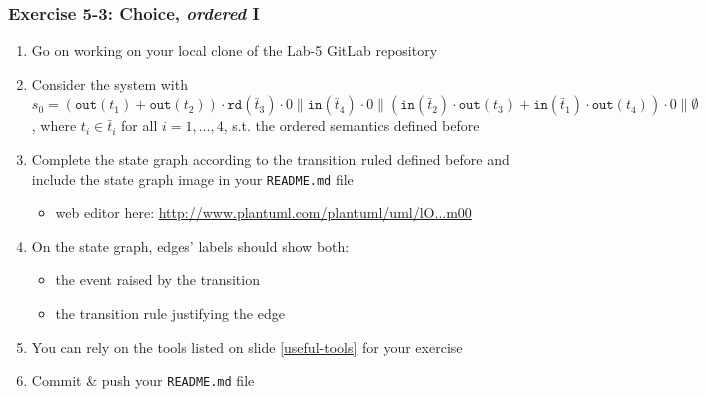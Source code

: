 \documentclass[presentation]{beamer}\mode<presentation>{\usetheme{AMSCesenaPurpleAndGold}}
\begin{document}
\begin{frame}
\frametitle{Exercise 5-3: Choice, \emph{ordered} I}
    \begin{enumerate}
        \item Go on working on your local clone of the Lab-5 GitLab repository
        
        \vfill
        
        \item Consider the system with \alert{$s_0 = (\mathtt{out}(t_1) + \mathtt{out}(t_2)) \cdot \mathtt{rd}(\bar{t}_3) \cdot 0 \parallel \mathtt{in}(\bar{t}_4) \cdot 0 \parallel (\mathtt{in}(\bar{t}_2) \cdot \mathtt{out}(t_3) + \mathtt{in}(\bar{t}_1) \cdot \mathtt{out}(t_4)) \cdot 0  \parallel \emptyset$}, where $t_i \in \bar{t}_i$ for all $i = 1,\ldots,4$, s.t. the \alert{ordered} \linda{} semantics defined before
        
        \vfill
    
        \item Complete the state graph according to the transition ruled defined before and include the state graph image in your \alert{\texttt{README.md}} file
        \begin{itemize}
            \item web editor here: \href{
                http://www.plantuml.com/plantuml/uml/lO_1JW8n48RlVOeviXB8mf4GGbmnUj43yOGS6ZfYGxVTj5CLZGSg9ho8R-DJx9EuiDeWuQgtQV_ld_-VeIDkoUUAkONK1RSyXpEyurxHkT4qbiy8tNHF71Cdt4cqL0YIk98pTznznNE4p7WhqR9xAH0mBsW90jtCoeAaqMpFwRQh0LuOm2cVBURMU2qoeupjzqTQI3qV3C0e-O37Y1kDJqKreQYe9Ifb7jahOvEJARHQ0t0fs-slXXuqZAS6bM6LG1E-vv0aRIiQzBakmrlIJg7SV83KzSVwy2CaxTfNiyqehA8GFUNcdRcqRj7fGSo-rPFiuleo6rMFQIIwaGW7nCy17VXzRG_-flUsP0pj_bzeO4FKmkVg2m00
            }{http://www.plantuml.com/plantuml/uml/lO...m00}
        \end{itemize}
        
        \vfill
        
        \item On the state graph, edges' labels should show both:
        \begin{itemize}
            \item the event raised by the transition
            \item the transition rule justifying the edge
        \end{itemize}
        
        \vfill
        
        \item You can rely on the tools listed on slide \ref{useful-tools} for your exercise
        
        \vfill
        
        \item Commit \& push your \texttt{README.md} file
        
    \end{enumerate}
    
\end{frame}
\end{document}
